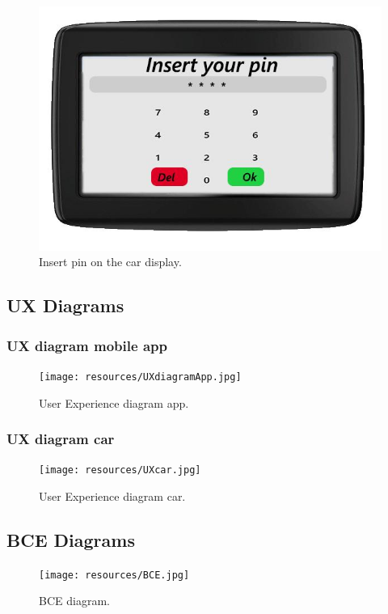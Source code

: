\begin{figure}[hp]
\centering
\includegraphics[width=400 pt]{resources/nav68.jpg}
\caption{\label{fig:pin}Insert pin on the car display.}
\end{figure}

\newpage
\subsection{UX Diagrams}
\subsubsection*{UX diagram mobile app}
\begin{figure}[hp]
\centering
\texttt{[image: resources/UXdiagramApp.jpg]}
\caption{\label{fig:uxApp}User Experience diagram app.}
\end{figure}

\newpage
\subsubsection*{UX diagram car}
\begin{figure}[hp]
\centering
\texttt{[image: resources/UXcar.jpg]}
\caption{\label{fig:uxCar}User Experience diagram car.}
\end{figure}

\newpage
\subsection{BCE Diagrams}
\begin{figure}[hp]
\centering
\texttt{[image: resources/BCE.jpg]}
\caption{\label{fig:bce}BCE diagram.}
\end{figure}